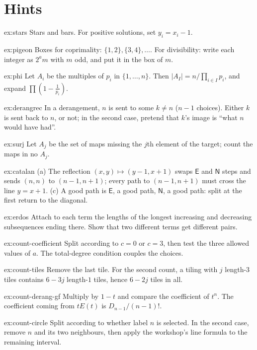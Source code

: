 \section{Hints}
\begin{hint}{ex:stars}
Stars and bars. For positive solutions, set $y_i=x_i-1$.
\end{hint}

\begin{hint}{ex:pigeon}
Boxes for coprimality: $\{1,2\},\{3,4\},\dots$. For divisibility: write each integer as $2^a m$ with $m$ odd, and put it in the box of $m$.
\end{hint}

\begin{hint}{ex:phi}
Let $A_i$ be the multiples of $p_i$ in $\{1,\dots,n\}$. Then $|A_I|=n/\prod_{i\in I}p_i$, and expand $\prod\left(1-\frac1{p_i}\right)$.
\end{hint}

\begin{hint}{ex:derangrec}
In a derangement, $n$ is sent to some $k\ne n$ ($n-1$ choices). Either $k$ is sent back to $n$, or not; in the second case, pretend that $k$'s image is ``what $n$ would have had''.
\end{hint}

\begin{hint}{ex:surj}
Let $A_j$ be the set of maps missing the $j$th element of the target; count the maps in no $A_j$.
\end{hint}

\begin{hint}{ex:catalan}
(a) The reflection $(x,y)\mapsto(y-1,x+1)$ swaps $\mathsf E$ and $\mathsf N$ steps and sends $(n,n)$ to $(n-1,n+1)$; every path to $(n-1,n+1)$ must cross the line $y=x+1$. (c) A good path is $\mathsf E$, a good path, $\mathsf N$, a good path: split at the first return to the diagonal.
\end{hint}

\begin{hint}{ex:erdos}
Attach to each term the lengths of the longest increasing and decreasing subsequences ending there. Show that two different terms get different pairs.
\end{hint}

\begin{hint}{ex:count-coefficient}
Split according to $c=0$ or $c=3$, then test the three allowed values of $a$. The total-degree condition couples the choices.
\end{hint}
\begin{hint}{ex:count-tiles}
Remove the last tile. For the second count, a tiling with $j$ length-$3$ tiles contains $6-3j$ length-$1$ tiles, hence $6-2j$ tiles in all.
\end{hint}
\begin{hint}{ex:count-derang-gf}
Multiply by $1-t$ and compare the coefficient of $t^n$. The coefficient coming from $tE(t)$ is $D_{n-1}/(n-1)!$.
\end{hint}
\begin{hint}{ex:count-circle}
Split according to whether label $n$ is selected. In the second case, remove $n$ and its two neighbours, then apply the workshop's line formula to the remaining interval.
\end{hint}

